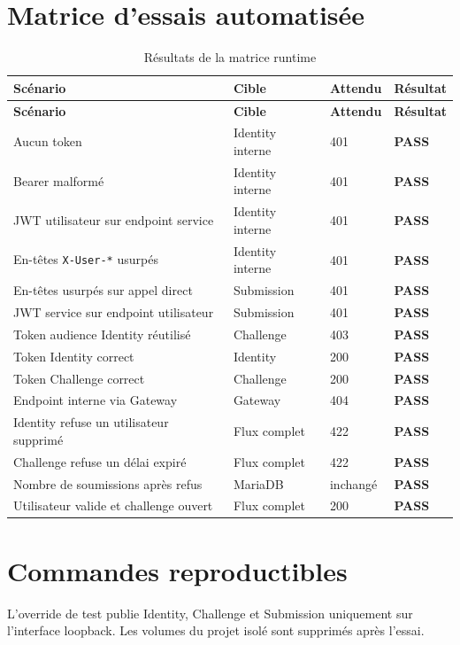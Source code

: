 \documentclass[12pt,a4paper,oneside]{report}
\newcommand{\code}[1]{\texttt{#1}}
\newcommand{\good}{\textcolor{ReportMint}{\textbf{PASS}}}
\begin{document}
\section{Matrice d'essais automatisée}
\begin{longtable}{P{7.4cm}P{2.2cm}P{2.2cm}P{1.8cm}}
\caption{Résultats de la matrice runtime}\label{tab:runtime-results}\\
\toprule
\textbf{Scénario} & \textbf{Cible} & \textbf{Attendu} & \textbf{Résultat} \\
\midrule
\endfirsthead
\toprule
\textbf{Scénario} & \textbf{Cible} & \textbf{Attendu} & \textbf{Résultat} \\
\midrule
\endhead
Aucun token & Identity interne & 401 & \good \\
Bearer malformé & Identity interne & 401 & \good \\
JWT utilisateur sur endpoint service & Identity interne & 401 & \good \\
En-têtes \code{X-User-*} usurpés & Identity interne & 401 & \good \\
En-têtes usurpés sur appel direct & Submission & 401 & \good \\
JWT service sur endpoint utilisateur & Submission & 401 & \good \\
Token audience Identity réutilisé & Challenge & 403 & \good \\
Token Identity correct & Identity & 200 & \good \\
Token Challenge correct & Challenge & 200 & \good \\
Endpoint interne via Gateway & Gateway & 404 & \good \\
Identity refuse un utilisateur supprimé & Flux complet & 422 & \good \\
Challenge refuse un délai expiré & Flux complet & 422 & \good \\
Nombre de soumissions après refus & MariaDB & inchangé & \good \\
Utilisateur valide et challenge ouvert & Flux complet & 200 & \good \\
\bottomrule
\end{longtable}

\section{Commandes reproductibles}
L'override de test publie Identity, Challenge et Submission uniquement sur
l'interface loopback. Les volumes du projet isolé sont supprimés après l'essai.
\end{document}
